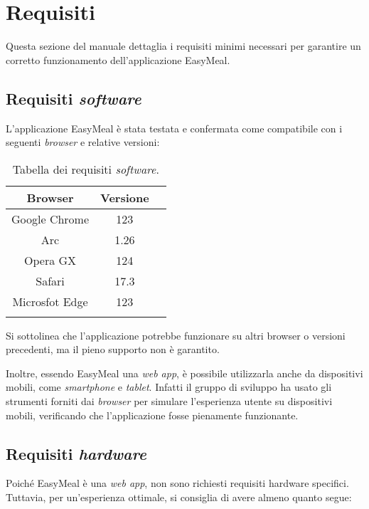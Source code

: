 \section{Requisiti}
Questa sezione del manuale dettaglia i requisiti minimi necessari per garantire 
un corretto funzionamento dell'applicazione EasyMeal.

\subsection{Requisiti \textit{software}}
L'applicazione EasyMeal è stata testata e confermata come compatibile con i 
seguenti \textit{browser} e relative versioni: 

\begin{longtable}{|c|c|c|}
	\hline
	\textbf{Browser}       & \textbf{ Versione}    \\
	\hline
    Google Chrome             & 123                    \\
    \hline
    Arc                       & 1.26                    \\
    \hline
    Opera GX                       & 124                    \\
    \hline
    Safari                        & 17.3                    \\
    \hline
    Microsfot Edge                 & 123                      \\
    \hline

    \caption{Tabella dei requisiti \textit{software}.}
\end{longtable}

Si sottolinea che l'applicazione potrebbe funzionare su altri browser o versioni 
precedenti, ma il pieno supporto non è garantito.

Inoltre, essendo EasyMeal una \textit{web app}, è possibile utilizzarla anche
da dispositivi mobili, come \textit{smartphone} e \textit{tablet}. Infatti il gruppo di sviluppo ha usato gli strumenti forniti dai \textit{browser} per simulare l'esperienza utente 
su dispositivi mobili, verificando che l'applicazione fosse pienamente funzionante.


\subsection{Requisiti \textit{hardware}}
Poiché EasyMeal è una \textit{web app}, non sono richiesti requisiti hardware specifici. 
Tuttavia, per un'esperienza ottimale, si consiglia di avere almeno quanto segue:


